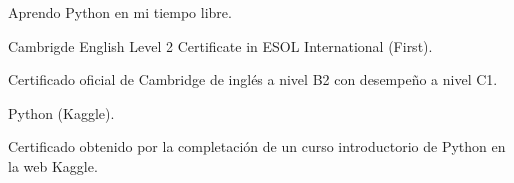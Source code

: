 










Aprendo Python en mi tiempo libre.

{\large \faCertificate \color{emphasis} \hspace{2mm} Cambrigde English Level 2 Certificate in ESOL International (First).}

Certificado oficial de Cambridge de inglés a nivel B2 con desempeño a nivel C1.
\vspace{5mm}

{\large \faCertificate \color{emphasis} \hspace{2mm} Python (Kaggle).}

Certificado obtenido por la completación de un curso introductorio de Python en la web Kaggle.

 


%
%
%
%


%
